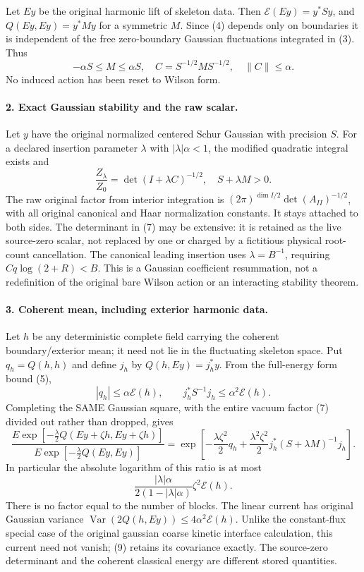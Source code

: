 \documentclass[11pt]{article}
\begin{document}
Let $Ey$ be the original harmonic lift of skeleton data. Then
$\mathcal E(Ey)=y^*Sy$, and $Q(Ey,Ey)=y^*My$ for a symmetric $M$.
Since (4) depends only on boundaries it is independent of the free
zero-boundary Gaussian fluctuations integrated in (3). Thus
\[
 -\alpha S\le M\le\alpha S,
 \quad C=S^{-1/2}MS^{-1/2},\quad\|C\|\le\alpha.               \tag{6}
\]
No induced action has been reset to Wilson form.

\paragraph{2. Exact Gaussian stability and the raw scalar.}
Let $y$ have the original normalized centered Schur Gaussian with
precision $S$. For a declared insertion parameter $\lambda$ with
$|\lambda|\alpha<1$, the modified quadratic integral exists and
\[
 \boxed{\frac{Z_\lambda}{Z_0}
       =\det(I+\lambda C)^{-1/2},\quad
 S+\lambda M>0.}                                            \tag{7}
\]
The raw original factor from interior integration is
$(2\pi)^{\dim I/2}\det(A_{II})^{-1/2}$, with all original canonical
and Haar normalization constants. It stays attached to both sides.
The determinant in (7) may be extensive: it is retained as the live
source-zero scalar, not replaced by one or charged by a fictitious
physical root-count cancellation. The canonical leading insertion
uses $\lambda=B^{-1}$, requiring $Cq\log(2+R)<B$.
This is a Gaussian coefficient resummation, not a redefinition of the
original bare Wilson action or an interacting stability theorem.

\paragraph{3. Coherent mean, including exterior harmonic data.}
Let $h$ be any deterministic complete field carrying the coherent
boundary/exterior mean; it need not lie in the fluctuating skeleton
space. Put $q_h=Q(h,h)$ and define $j_h$ by
$Q(h,Ey)=j_h^*y$. From the full-energy form bound (5),
\[
 |q_h|\le\alpha\mathcal E(h),\qquad
 j_h^*S^{-1}j_h\le\alpha^2\mathcal E(h).                       \tag{8}
\]
Completing the SAME Gaussian square, with the entire vacuum factor
(7) divided out rather than dropped, gives
\[
 \boxed{\frac{E\exp[-\frac\lambda2 Q(Ey+\zeta h,Ey+\zeta h)]}
 {E\exp[-\frac\lambda2 Q(Ey,Ey)]}
 =\exp\left[-\frac{\lambda\zeta^2}{2}q_h
       +\frac{\lambda^2\zeta^2}{2}
          j_h^*(S+\lambda M)^{-1}j_h\right].}                 \tag{9}
\]
In particular the absolute logarithm of this ratio is at most
\[
 \frac{|\lambda|\alpha}{2(1-|\lambda|\alpha)}
                            \zeta^2\mathcal E(h).             \tag{10}
\]
There is no factor equal to the number of blocks. The linear current
has original Gaussian variance
$\operatorname{Var}(2Q(h,Ey))\le4\alpha^2\mathcal E(h)$.
Unlike the constant-flux special case of the original gaussian coarse kinetic interface calculation, this current need not vanish;
(9) retains its covariance exactly. The source-zero determinant and
the coherent classical energy are different stored quantities.
\end{document}
